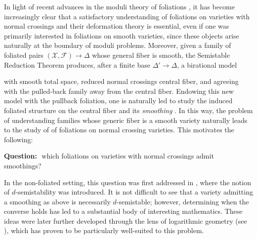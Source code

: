 \documentclass[reqno]{amsart}
\newcommand{\X}{\mathcal{X}}
\newcommand{\F}{\mathscr{F}}
\newcounter{Theorem}
\theoremstyle{definition}
\theoremstyle{named}
\begin{document}
In light of recent advances in the moduli theory of foliations \cite{spicer2025moduli}, it has become increasingly clear that a satisfactory understanding of foliations on  varieties with normal crossings and their deformation theory is essential, even if one was primarily interested in foliations on smooth varieties, since these objects arise naturally at the boundary of moduli problems. Moreover, given a family of foliated pairs $(\X,\F)\to \Delta$ whose general fiber is smooth, the Semistable Reduction Theorem produces, after a finite base  $\Delta'\to \Delta$, a birational model
\begin{center}
\end{center}
with smooth total space, reduced normal crossings central fiber, and agreeing with the pulled-back family away from the central fiber. Endowing this new model with the pullback foliation, one is naturally led to study the induced foliated structure on the central fiber and its \emph{smoothing} \smash{$(\widetilde{X},\widetilde\F)\to \Delta$}. In this way, the problem of understanding families whose generic fiber is a smooth variety naturally leads to the study of  of foliations on normal crossing varieties.
This motivates the following: 

\textbf{Question:}\, \,which foliations on varieties with normal crossings admit smoothings?

In the non-foliated setting, this question was first addressed in \cite{friedman1983global}, where the notion of $d$-semistability was introduced. It is not difficult to see that a variety admitting a smoothing as above is necessarily $d$-semistable; however, determining when the converse holds has led to a substantial body of interesting mathematics. These ideas were later further developed through the lens of logarithmic geometry (see \cite{kawamata1994logarithmic,kato1988logarithmic_str,kato1996dlog_def}), which has proven to be particularly well-suited to this problem.
\end{document}
